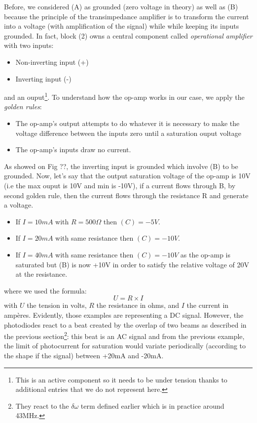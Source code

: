 \documentclass[11pt]{report}
\begin{document}
Before, we considered (A) as grounded (zero voltage in theory) as well as (B) because the principle of the transimpedance amplifier is to transform the current into a voltage (with amplification of the signal) while while keeping its inputs grounded. In fact, block (2) owns a central component called \textit{operational amplifier} with two inputs:
\begin{itemize}
 \item Non-inverting input (+)
 \item Inverting input (-)
\end{itemize}
and an ouput\footnote{This is an active component so it needs to be under tension thanks to additional entries that we do not represent here.}. To understand how the op-amp works in our case, we apply the \textit{golden rules}:
\begin{itemize}
 \item The op-amp's output attempts to do whatever it is necessary to make the voltage difference between the inputs zero until a saturation ouput voltage
 \item The op-amp's inputs draw no current.
\end{itemize} As showed on Fig ??, the inverting input is grounded which involve (B) to be grounded. Now, let's say that the output saturation voltage of the op-amp is 10V (i.e the max ouput is 10V and min is -10V), if a current flows through B, by second golden rule, then the current flows through the resistance R and generate a voltage.
\begin{itemize}
	\item If $I = 10mA$ with $R = 500\Omega$ then $(C) = -5V$.
	\item If $I = 20mA$ with same resistance then $(C) = -10V$.
	\item If $I = 40mA$ with same resistance then $(C) = -10V$ as the op-amp is saturated but (B) is now +10V in order to satisfy the relative voltage of 20V at the resistance.
\end{itemize}
where we used the formula:
\begin{equation}
\label{ueqri}
U = R \times I
\end{equation}
with $U$ the tension in volts, $R$ the resistance in ohms, and $I$ the current in ampères. Evidently, those examples are representing a DC signal. However, the photodiodes react to a beat created by the overlap of two beams as described in the previous section\footnote{They react to the $\delta\omega$ term defined earlier which is in practice around 43MHz.}: this beat is an AC signal and from the previous example, the limit of photocurrent for saturation would variate periodically (according to the shape if the signal) between +20mA and -20mA.
\end{document}
